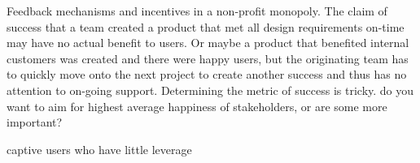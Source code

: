 Feedback mechanisms and incentives in a non-profit monopoly. The claim of success that a team created a product that met all design requirements on-time may have no actual benefit to users. Or maybe a product that benefited internal customers was created and there were happy users, but the originating team has to quickly move onto the next project to create another success and thus has no attention to on-going support. Determining the metric of success is tricky. do you want to aim for highest average happiness of stakeholders, or are some more important?

captive users who have little leverage 



